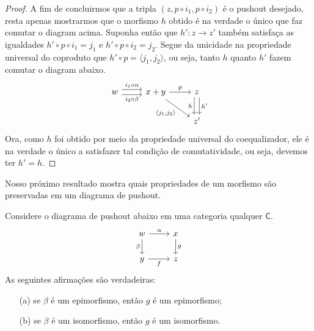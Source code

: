 \begin{proof}
    A fim de concluirmos que a tripla $(z,p \circ i_1, p \circ i_2)$ é o pushout desejado, resta apenas mostrarmos que o morfismo $h$ obtido é na verdade o único que faz comutar o diagram acima.
    Suponha então que $h': z \to z'$ também satisfaça as igualdades $h' \circ p \circ i_1 = j_1$ e $h' \circ p \circ i_2 = j_2$.
    Segue da unicidade na propriedade universal do coproduto que $h' \circ p = \langle j_1,j_2 \rangle$, ou seja, tanto $h$ quanto $h'$ fazem comutar o diagram abaixo.
     \begin{displaymath}
        \begin{tikzcd}
            w
            \arrow[r, shift left=1.25, "i_1 \circ \alpha"]
            \arrow[r, shift right=1.25, "i_2 \circ \beta" swap]
            & x+y
            \arrow[r, "p"]
            \arrow[rd, "{\langle j_1,j_2 \rangle}" swap]
            & z
            \arrow[d, shift right=1.25, "h" swap]
            \arrow[d, shift left=1.25, "h'"]
            \\ & & z'
        \end{tikzcd}
      \end{displaymath}
      Ora, como $h$ foi obtido por meio da propriedade universal do coequalizador, ele é na verdade o único a satisfazer tal condição de comutatividade, ou seja, devemos ter $h'= h$.
\end{proof}

Nosso próximo resultado mostra quais propriedades de um morfismo são preservadas em um diagrama de pushout.

\begin{teo}\label{teo:props_preservadas_pushout}
    Considere o diagrama de pushout abaixo em uma categoria qualquer $\mathsf{C}$.
    \begin{displaymath}
        \begin{tikzcd}
            w
            \arrow[r, "\alpha"]
            \arrow[d, "\beta" swap]
            & x
            \arrow[d, "g"]
            \\ y
            \arrow[r, "f" swap]
            & z
        \end{tikzcd}
    \end{displaymath}
    As seguintes afirmações são verdadeiras:
    \begin{enumerate}
        \item[(a)] se $\beta$ é um epimorfismo, então $g$ é um epimorfismo;

        \item[(b)] se $\beta$ é um isomorfismo, então $g$ é um isomorfismo.
    \end{enumerate}
\end{teo}

